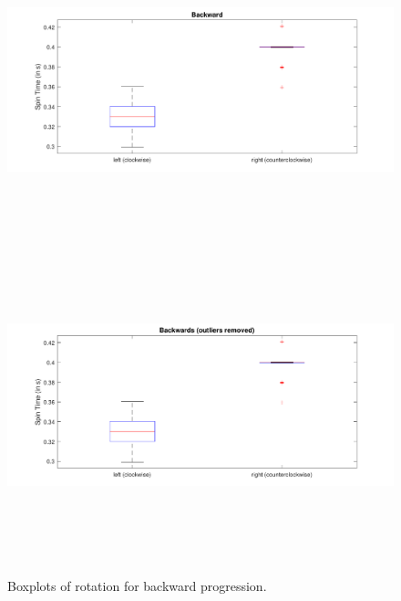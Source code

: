\documentclass[a4paper,twoside]{book}
\begin{document}
\begin{figure}[h]
 
\includegraphics[width=\paperwidth, height=9cm, center]{img/backward} 
\includegraphics[width=\paperwidth, height=9cm, center]{img/backward2}
\caption{Boxplots of rotation for backward progression.}

\end{figure}
\end{document}
